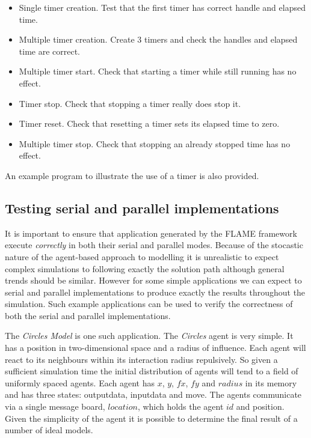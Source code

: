 \begin{itemize}
	\item Single timer creation. Test that the first timer has correct handle and elapsed time.
	\item Multiple timer creation. Create 3 timers and check the handles and elapsed time are correct.
	\item Multiple timer start. Check that starting a timer while still running has no effect.
	\item Timer stop. Check that stopping a timer really does stop it.
	\item Timer reset. Check that resetting a timer sets its elapsed time to zero.
	\item Multiple timer stop. Check that stopping an already stopped time has no effect.
\end{itemize}

An example program to illustrate the use of a timer is also provided.

\subsection{Testing serial and parallel implementations}
It is important to ensure that application generated by the FLAME framework execute \textsl{correctly} in both their serial and parallel modes. Because of the stocastic nature of the agent-based approach to modelling it is unrealistic to expect complex simulations to following exactly the solution path although general trends should be similar. However for some simple applications we can expect to serial and parallel implementations to produce exactly the results throughout the simulation. Such example applications can be used to verify the correctness of both the serial and parallel implementations.

The \textsl{Circles Model} is one such application. The \textsl{Circles} agent is very simple. It has a position in two-dimensional space and a radius of influence. Each agent will react to its neighbours within its interaction radius repulsively. So given a sufficient simulation time the initial distribution of agents will tend to a field of uniformly spaced agents. Each agent has $x$, $y$, $fx$, $fy$ and $radius$ in its memory and has three states: outputdata, inputdata and move. The agents communicate via a single message board, $location$, which holds the agent $id$ and position. Given the simplicity of the agent it is possible to determine the final result of a number of ideal models.

